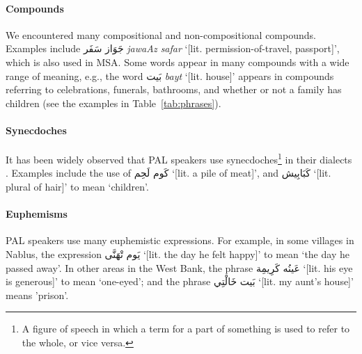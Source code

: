 \paragraph{Compounds}
We encountered many compositional and non-compositional compounds. Examples include  \foreignlanguage{arabic}{جَوَاز سَفَر} 
{\it jawaAz safar}
 `[lit. permission-of-travel, passport]', which is also used in MSA. Some words appear in many compounds with a wide range of meaning, e.g.,
the word \foreignlanguage{arabic}{بَيت} {\it bayt} `[lit. house]' appears in compounds referring to celebrations, funerals, bathrooms, and whether or not a family has children (see the examples in  Table~\ref{tab:phrases}).

\paragraph{Synecdoches}
It has  been widely observed that PAL speakers use synecdoches\footnote{A figure of speech in which a term for a part of something is used to refer to the whole, or vice versa.} in their dialects \citep{seto1999distinguishing}.
Examples include the use of \foreignlanguage{arabic}{كَوم لَحِم}  `[lit. a pile of meat]', and \foreignlanguage{arabic}{كَبَابِيش}   `[lit. plural of hair]' to mean `children'.


\paragraph{Euphemisms}
PAL speakers use many euphemistic expressions. For example, in some villages 
in Nablus, the expression \foreignlanguage{arabic}{يَوم تْهَنَّى} 
 `[lit. the day he felt happy]' to mean `the day he passed away'. 
In other areas in the West Bank, 
the phrase \foreignlanguage{arabic}{عَينُه كَرِيمِة} 
`[lit. his eye is generous]'
to mean `one-eyed'; and the phrase
\foreignlanguage{arabic}{بَيت خَالْتِي}
`[lit. my aunt's house]' means 'prison'.

